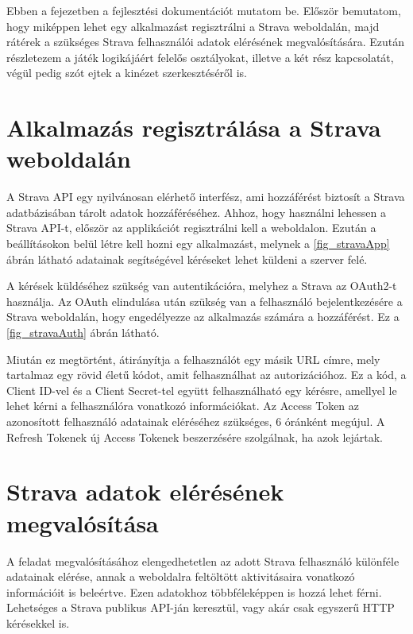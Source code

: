 Ebben a fejezetben a fejlesztési dokumentációt mutatom be. Először bemutatom, hogy miképpen lehet egy alkalmazást regisztrálni a Strava weboldalán, majd rátérek a szükséges Strava felhasználói adatok elérésének megvalósítására. Ezután részletezem a játék logikájáért felelős osztályokat, illetve a két rész kapcsolatát, végül pedig szót ejtek a kinézet szerkesztéséről is. 

\section{Alkalmazás regisztrálása a Strava weboldalán}

A Strava API egy nyilvánosan elérhető interfész, ami hozzáférést biztosít a Strava adatbázisában tárolt adatok hozzáféréséhez. Ahhoz, hogy használni lehessen a Strava API-t, először az applikációt regisztrálni kell a weboldalon. Ezután a beállításokon belül létre kell hozni egy alkalmazást, melynek a \ref{fig_stravaApp} ábrán látható adatainak segítségével kéréseket lehet küldeni a szerver felé. 


A kérések küldéséhez szükség van autentikációra, melyhez a Strava az OAuth2-t használja. Az OAuth elindulása után szükség van a felhasználó bejelentkezésére a Strava weboldalán, hogy engedélyezze az alkalmazás számára a hozzáférést. Ez a \ref{fig_stravaAuth} ábrán látható. 


Miután ez megtörtént, átirányítja a felhasználót egy másik URL címre, mely tartalmaz egy rövid életű kódot, amit felhasználhat az autorizációhoz. Ez a kód, a Client ID-vel és a Client Secret-tel együtt felhasználható egy kérésre, amellyel le lehet kérni a felhasználóra vonatkozó információkat. Az Access Token az azonosított felhasználó adatainak eléréséhez szükséges, 6 óránként megújul. A Refresh Tokenek új Access Tokenek beszerzésére szolgálnak, ha azok lejártak. 

\section{Strava adatok elérésének megvalósítása}

A feladat megvalósításához elengedhetetlen az adott Strava felhasználó különféle adatainak elérése, annak a weboldalra feltöltött aktivitásaira vonatkozó információit is beleértve. Ezen adatokhoz többféleképpen is hozzá lehet férni. Lehetséges a Strava publikus API-ján keresztül, vagy akár csak egyszerű HTTP kérésekkel is. 

